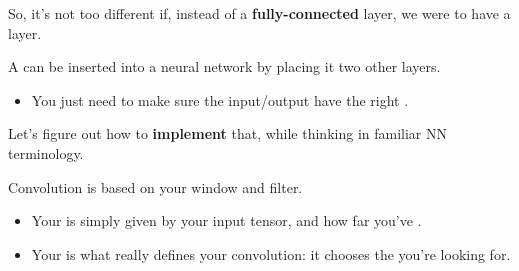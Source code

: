         So, it's not too different if, instead of a \textbf{fully-connected} layer, we were to have a  layer.\\

        \begin{concept}
            A  can be inserted into a neural network by placing it  two other layers.

            \begin{itemize}
                \item You just need to make sure the input/output have the right .
            \end{itemize}
        \end{concept}

        Let's figure out how to \textbf{implement} that, while thinking in familiar NN terminology.

        Convolution is based on your window and filter. 
        
        \begin{itemize}
            \item Your  is simply given by your input tensor, and how far you've .
            \item Your  is what really defines your convolution: it chooses the  you're looking for.
        \end{itemize}

        

